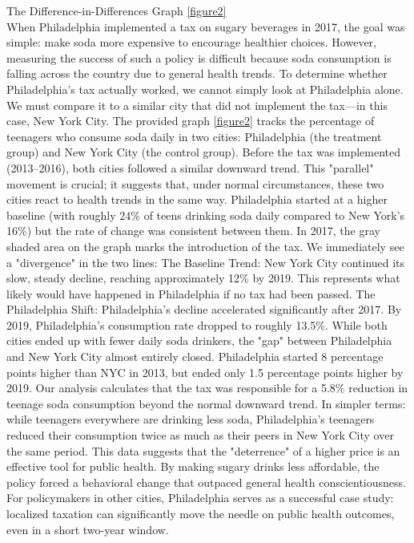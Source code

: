 \documentclass[12pt, a4paper]{article}
\begin{document}
The Difference-in-Differences Graph \ref{figure2}
\\
When Philadelphia implemented a tax on sugary beverages in 2017, the goal was simple: make soda more expensive to encourage healthier choices. However, measuring the success of such a policy is difficult because soda consumption is falling across the country due to general health trends. To determine whether Philadelphia's tax actually worked, we cannot simply look at Philadelphia alone. We must compare it to a similar city that did not implement the tax—in this case, New York City.
The provided graph \ref{figure2} tracks the percentage of teenagers who consume soda daily in two cities: Philadelphia (the treatment group) and New York City (the control group).
Before the tax was implemented (2013–2016), both cities followed a similar downward trend. This "parallel" movement is crucial; it suggests that, under normal circumstances, these two cities react to health trends in the same way. Philadelphia started at a higher baseline (with roughly 24\% of teens drinking soda daily compared to New York’s 16\%) but the rate of change was consistent between them.
In 2017, the gray shaded area on the graph marks the introduction of the tax. We immediately see a "divergence" in the two lines:
The Baseline Trend: New York City continued its slow, steady decline, reaching approximately 12\% by 2019. This represents what likely would have happened in Philadelphia if no tax had been passed.
The Philadelphia Shift: Philadelphia’s decline accelerated significantly after 2017. By 2019, Philadelphia’s consumption rate dropped to roughly 13.5\%.
While both cities ended up with fewer daily soda drinkers, the "gap" between Philadelphia and New York City almost entirely closed. Philadelphia started 8 percentage points higher than NYC in 2013, but ended only 1.5 percentage points higher by 2019.
Our analysis calculates that the tax was responsible for a 5.8\% reduction in teenage soda consumption beyond the normal downward trend. In simpler terms: while teenagers everywhere are drinking less soda, Philadelphia’s teenagers reduced their consumption twice as much as their peers in New York City over the same period.
This data suggests that the "deterrence" of a higher price is an effective tool for public health. By making sugary drinks less affordable, the policy forced a behavioral change that outpaced general health conscientiousness. For policymakers in other cities, Philadelphia serves as a successful case study: localized taxation can significantly move the needle on public health outcomes, even in a short two-year window.
\\
\end{document}

